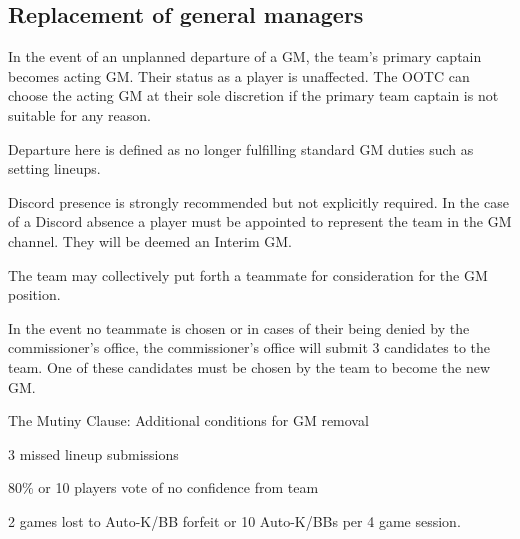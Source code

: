 \subsection{Replacement of general managers}
\begin{deepEnumerate}
      \item In the event of an unplanned departure of a GM,
            the team's primary captain becomes acting GM.
            Their status as a player is unaffected.
            The OOTC can choose the acting GM at their sole discretion
            if the primary team captain is not suitable for any reason.
            \begin{deepEnumerate}
                  \item Departure here is defined as no longer fulfilling standard GM duties
                        such as setting lineups.
                        \begin{deepEnumerate}
                              \item Discord presence is strongly recommended but not explicitly required.
                                    In the case of a Discord absence a player must be appointed
                                    to represent the team in the GM channel.
                                    They will be deemed an Interim GM.
                        \end{deepEnumerate}
            \end{deepEnumerate}
      \item The team may collectively put forth a teammate for consideration for the GM position.
      \item In the event no teammate is chosen 
            or in cases of their being denied by the commissioner’s office,
            the commissioner’s office will submit 3 candidates to the team.
            One of these candidates must be chosen by the team to become the new GM.
      \item The Mutiny Clause: Additional conditions for GM removal
            \begin{deepEnumerate}
                  \item 3 missed lineup submissions
                  \item 80\% or 10 players vote of no confidence from team
                  \item 2 games lost to Auto-K/BB forfeit or 10 Auto-K/BBs per 4 game session.
            \end{deepEnumerate}
\end{deepEnumerate}

